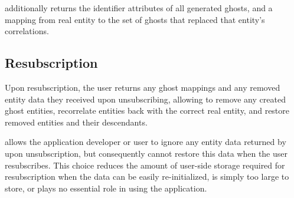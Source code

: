 \sys additionally returns the identifier attributes of all generated ghosts, and a mapping from real
entity to the set of ghosts that replaced that entity's correlations. 

\subsection{Resubscription}
Upon resubscription, the user returns any ghost mappings and any removed entity data they received
upon unsubscribing, allowing \sys to remove any created ghost entities, recorrelate entities back
with the correct real entity, and restore removed entities and their descendants. 

\sys allows the application developer or user to ignore any entity data returned by \sys upon
unsubscription, but consequently cannot restore this data when the user resubscribes.  This choice
reduces the amount of user-side storage required for resubscription when the data can be easily
re-initialized, is simply too large to store, or plays no essential role in using the application.

